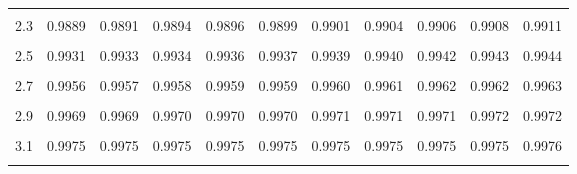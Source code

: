 \documentclass[
]{article}
\begin{document}
\begin{longtable}[l]{lcccccccccc}
\cellcolor{gray!15}{2.2} & \cellcolor{gray!15}{0.9858} & \cellcolor{gray!15}{0.9861} & \cellcolor{gray!15}{0.9865} & \cellcolor{gray!15}{0.9868} & \cellcolor{gray!15}{0.9871} & \cellcolor{gray!15}{0.9874} & \cellcolor{gray!15}{0.9877} & \cellcolor{gray!15}{0.9880} & \cellcolor{gray!15}{0.9883} & \cellcolor{gray!15}{0.9886}\\
2.3 & 0.9889 & 0.9891 & 0.9894 & 0.9896 & 0.9899 & 0.9901 & 0.9904 & 0.9906 & 0.9908 & 0.9911\\
\cellcolor{gray!15}{2.4} & \cellcolor{gray!15}{0.9913} & \cellcolor{gray!15}{0.9915} & \cellcolor{gray!15}{0.9917} & \cellcolor{gray!15}{0.9919} & \cellcolor{gray!15}{0.9921} & \cellcolor{gray!15}{0.9923} & \cellcolor{gray!15}{0.9924} & \cellcolor{gray!15}{0.9926} & \cellcolor{gray!15}{0.9928} & \cellcolor{gray!15}{0.9930}\\
2.5 & 0.9931 & 0.9933 & 0.9934 & 0.9936 & 0.9937 & 0.9939 & 0.9940 & 0.9942 & 0.9943 & 0.9944\\
\cellcolor{gray!15}{2.6} & \cellcolor{gray!15}{0.9945} & \cellcolor{gray!15}{0.9947} & \cellcolor{gray!15}{0.9948} & \cellcolor{gray!15}{0.9949} & \cellcolor{gray!15}{0.9950} & \cellcolor{gray!15}{0.9951} & \cellcolor{gray!15}{0.9952} & \cellcolor{gray!15}{0.9953} & \cellcolor{gray!15}{0.9954} & \cellcolor{gray!15}{0.9955}\\
2.7 & 0.9956 & 0.9957 & 0.9958 & 0.9959 & 0.9959 & 0.9960 & 0.9961 & 0.9962 & 0.9962 & 0.9963\\
\cellcolor{gray!15}{2.8} & \cellcolor{gray!15}{0.9964} & \cellcolor{gray!15}{0.9964} & \cellcolor{gray!15}{0.9965} & \cellcolor{gray!15}{0.9965} & \cellcolor{gray!15}{0.9966} & \cellcolor{gray!15}{0.9966} & \cellcolor{gray!15}{0.9967} & \cellcolor{gray!15}{0.9967} & \cellcolor{gray!15}{0.9968} & \cellcolor{gray!15}{0.9968}\\
2.9 & 0.9969 & 0.9969 & 0.9970 & 0.9970 & 0.9970 & 0.9971 & 0.9971 & 0.9971 & 0.9972 & 0.9972\\
\cellcolor{gray!15}{3} & \cellcolor{gray!15}{0.9972} & \cellcolor{gray!15}{0.9973} & \cellcolor{gray!15}{0.9973} & \cellcolor{gray!15}{0.9973} & \cellcolor{gray!15}{0.9973} & \cellcolor{gray!15}{0.9974} & \cellcolor{gray!15}{0.9974} & \cellcolor{gray!15}{0.9974} & \cellcolor{gray!15}{0.9974} & \cellcolor{gray!15}{0.9974}\\
3.1 & 0.9975 & 0.9975 & 0.9975 & 0.9975 & 0.9975 & 0.9975 & 0.9975 & 0.9975 & 0.9975 & 0.9976\\
\cellcolor{gray!15}{3.2} & \cellcolor{gray!15}{0.9976} & \cellcolor{gray!15}{0.9976} & \cellcolor{gray!15}{0.9976} & \cellcolor{gray!15}{0.9976} & \cellcolor{gray!15}{0.9976} & \cellcolor{gray!15}{0.9976} & \cellcolor{gray!15}{0.9976} & \cellcolor{gray!15}{0.9976} & \cellcolor{gray!15}{0.9976} & \cellcolor{gray!15}{0.9976}\\

\end{longtable}
\end{document}
